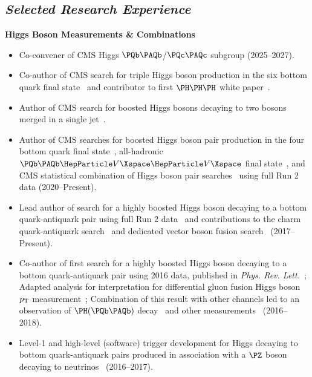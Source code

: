 \documentclass[11pt]{res}
\newcommand{\MarginText}[1]{\section{\textit{#1}}}
\begin{document}
\begin{resume}
  \MarginText{Selected Research Experience}

  \textbf{Higgs Boson Measurements \& Combinations}
  \begin{itemize}
    \itemsep-0.3em
    \item Co-convener of CMS Higgs $\bbbar$/$\ccbar$ subgroup ({2025--2027}).
    \item Co-author of CMS search for triple Higgs boson production in the six bottom quark final state~\cite{CMS:2026xkc} and contributor to first $\PH\PH\PH$ white paper~\cite{Brigljevic:2024vuv}.
    \item Author of CMS search for boosted Higgs bosons decaying to two \PW bosons merged in a single jet~\cite{CMS:2026yrb}.
    \item Author of CMS searches for boosted Higgs boson pair production in the four bottom quark final state~\cite{CMS:2026znu,CMS:2022nmn}, all-hadronic $\bbbar\PV\PV$ final state~\cite{CMS:2026shw,CMS-PAS-HIG-23-012}, and CMS statistical combination of Higgs boson pair searches~\cite{CMS:2025ngq,CMS:2022dwd} using full Run 2 data ({2020--Present}).
    \item Lead author of search for a highly boosted Higgs boson decaying to a bottom quark-antiquark pair using full Run 2 data~\cite{Sirunyan:2020hwz} and contributions to the charm quark-antiquark search~\cite{CMS:2022wqf} and dedicated vector boson fusion search~\cite{CMS:2024ddc} ({2017--Present}).
    \item Co-author of first search for a highly boosted Higgs boson decaying to a bottom quark-antiquark pair using 2016 data, published in \emph{Phys. Rev. Lett.}~\cite{Sirunyan:2017dgc}; Adapted analysis for interpretation for differential gluon fusion Higgs boson $p_{\mathrm{T}}$ measurement~\cite{Sirunyan:2018sgc}; Combination of this result with other channels led to an observation of $\PH(\bbbar)$ decay~\cite{Sirunyan:2018kst} and other measurements~\cite{Sirunyan:2018koj} ({2016--2018}).
    \item Level-1 and high-level (software) trigger development for Higgs decaying to bottom quark-antiquark pairs produced in association with a $\PZ$ boson decaying to neutrinos~\cite{Sirunyan:2018kst} ({2016--2017}).
  \end{itemize}


\end{resume}
\end{document}
